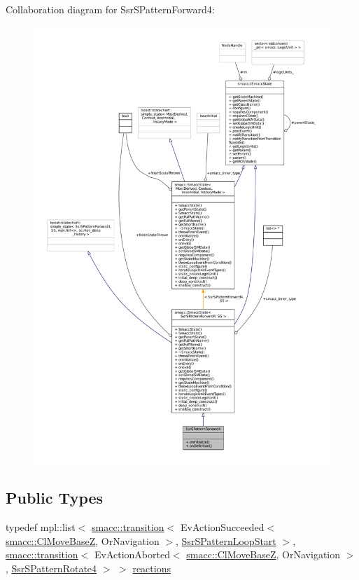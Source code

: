 Collaboration diagram for Ssr\+S\+Pattern\+Forward4\+:
\nopagebreak
\begin{figure}[H]
\begin{center}
\leavevmode
\includegraphics[width=350pt]{structSsrSPatternForward4__coll__graph}
\end{center}
\end{figure}
\subsection*{Public Types}
\begin{DoxyCompactItemize}
\item 
typedef mpl\+::list$<$ \hyperlink{classsmacc_1_1transition}{smacc\+::transition}$<$ Ev\+Action\+Succeeded$<$ \hyperlink{classsmacc_1_1ClMoveBaseZ}{smacc\+::\+Cl\+Move\+BaseZ}, Or\+Navigation $>$, \hyperlink{structSsrSPatternLoopStart}{Ssr\+S\+Pattern\+Loop\+Start} $>$, \hyperlink{classsmacc_1_1transition}{smacc\+::transition}$<$ Ev\+Action\+Aborted$<$ \hyperlink{classsmacc_1_1ClMoveBaseZ}{smacc\+::\+Cl\+Move\+BaseZ}, Or\+Navigation $>$, \hyperlink{structSsrSPatternRotate4}{Ssr\+S\+Pattern\+Rotate4} $>$ $>$ \hyperlink{structSsrSPatternForward4_adbf672343fe9065db27f75352f6db219}{reactions}
\end{DoxyCompactItemize}
